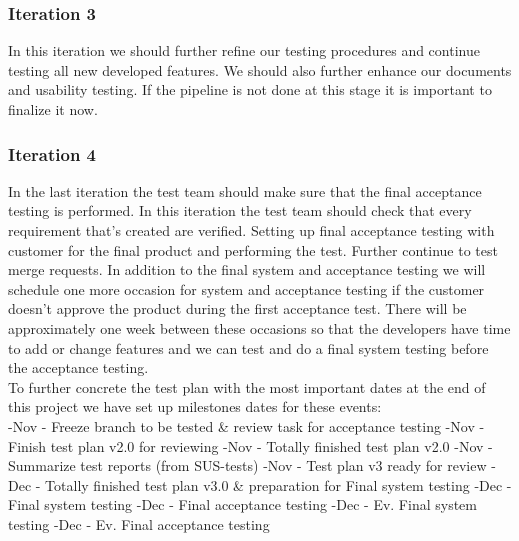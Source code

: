 \subsubsection{Iteration 3}
In this iteration we should further refine our testing procedures and continue testing all new developed features. We should also further enhance our documents and usability testing. If the pipeline is not done at this stage it is important to finalize it now.  


\subsubsection{Iteration 4}
In the last iteration the test team should make sure that the final acceptance testing is performed. In this iteration the test team should check that every requirement that's created are verified.     
Setting up final acceptance testing with customer for the final product and performing the test. Further continue to test merge requests. In addition to the final system and acceptance testing we will schedule one more occasion for system and acceptance testing if the customer doesn't approve the product during the first acceptance test. There will be approximately one week between these occasions so that the developers have time to add or change features and we can test and do a final system testing before the acceptance testing. \\


\noindent To further concrete the test plan with the most important dates at the end of this project we have set up milestones dates for these events:\\
-Nov - Freeze branch to be tested \& review task for acceptance testing\newline
{}-Nov - Finish test plan v2.0 for reviewing\newline
{}-Nov - Totally finished test plan v2.0\newline
{}-Nov - Summarize test reports (from SUS-tests)\newline
{}-Nov - Test plan v3 ready for review\newline
{}-Dec - Totally finished test plan v3.0 \& preparation for Final system testing\newline
{}-Dec - Final system testing\newline
{}-Dec - Final acceptance testing\newline
{}-Dec - Ev. Final system testing\newline
{}-Dec - Ev. Final acceptance testing\newline



